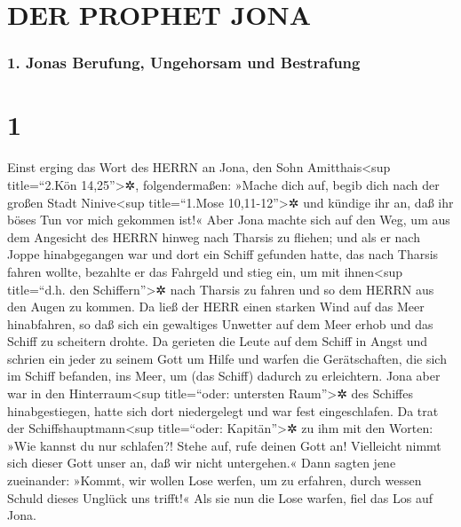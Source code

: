 \hypertarget{der-prophet-jona}{%
\section{DER PROPHET JONA}\label{der-prophet-jona}}

\hypertarget{jonas-berufung-ungehorsam-und-bestrafung}{%
\subsubsection{1. Jonas Berufung, Ungehorsam und
Bestrafung}\label{jonas-berufung-ungehorsam-und-bestrafung}}

\hypertarget{section}{%
\section{1}\label{section}}

Einst erging das Wort des HERRN an Jona, den Sohn
Amitthais\textless sup title=``2.Kön 14,25''\textgreater✲,
folgendermaßen: »Mache dich auf, begib dich nach der
großen Stadt Ninive\textless sup title=``1.Mose 10,11-12''\textgreater✲
und kündige ihr an, daß ihr böses Tun vor mich gekommen ist!«
Aber Jona machte sich auf den Weg, um aus dem Angesicht
des HERRN hinweg nach Tharsis zu fliehen; und als er nach Joppe
hinabgegangen war und dort ein Schiff gefunden hatte, das nach Tharsis
fahren wollte, bezahlte er das Fahrgeld und stieg ein, um mit
ihnen\textless sup title=``d.h. den Schiffern''\textgreater✲ nach
Tharsis zu fahren und so dem HERRN aus den Augen zu kommen.
Da ließ der HERR einen starken Wind auf das Meer
hinabfahren, so daß sich ein gewaltiges Unwetter auf dem Meer erhob und
das Schiff zu scheitern drohte. Da gerieten die Leute auf
dem Schiff in Angst und schrien ein jeder zu seinem Gott um Hilfe und
warfen die Gerätschaften, die sich im Schiff befanden, ins Meer, um (das
Schiff) dadurch zu erleichtern. Jona aber war in den
Hinterraum\textless sup title=``oder: untersten Raum''\textgreater✲ des
Schiffes hinabgestiegen, hatte sich dort niedergelegt und war fest
eingeschlafen. Da trat der Schiffshauptmann\textless sup
title=``oder: Kapitän''\textgreater✲ zu ihm mit den Worten: »Wie kannst
du nur schlafen?! Stehe auf, rufe deinen Gott an! Vielleicht nimmt sich
dieser Gott unser an, daß wir nicht untergehen.« Dann
sagten jene zueinander: »Kommt, wir wollen Lose werfen, um zu erfahren,
durch wessen Schuld dieses Unglück uns trifft!« Als sie nun die Lose
warfen, fiel das Los auf Jona.

